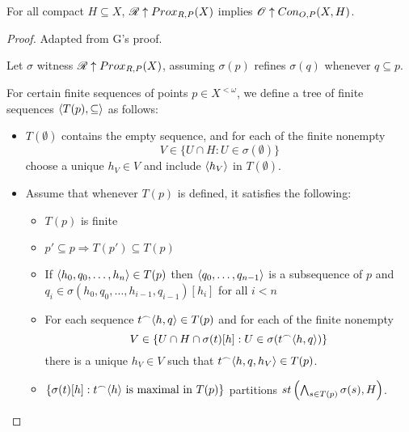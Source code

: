 \begin{theorem}
  For all compact $H\subseteq X$, $\mathscr{R} \uparrow Prox_{R,P}(X)$ implies $\mathscr{O} \uparrow Con_{O,P}(X,H)$.
\end{theorem}

\begin{proof}
  Adapted from G's proof.

  Let $\sigma$ witness $\mathscr{R} \uparrow Prox_{R,P}(X)$, assuming $\sigma(p)$ refines $\sigma(q)$ whenever $q\subseteq p$.

  For certain finite sequences of points $p\in X^{<\omega}$, we define a tree of finite sequences $\langle T(p),\subseteq\rangle$ as follows:

  \begin{itemize}
    \item $T(\emptyset)$ contains the empty sequence, and for each of the finite nonempty
      \[
        V\in\{U\cap H: U\in\sigma(\emptyset)\}
      \]
      choose a unique $h_V\in V$ and include $\langle h_V\rangle$ in $T(\emptyset)$.
    \item Assume that whenever $T(p)$ is defined, it satisfies the following:
      \begin{itemize}
        \item $T(p)$ is finite
        \item $p'\subseteq p \Rightarrow T(p')\subseteq T(p)$
        \item If $\langle h_0,q_0,\dots,h_n\rangle\in T(p)$ then $\langle q_0,\dots,q_{n-1}\rangle$ is a subsequence of $p$ and $q_i\in\sigma(h_0,q_0,\dots,h_{i-1},q_{i-1})[h_i]$ for all $i<n$
        \item For each sequence $t^\frown\langle h,q\rangle\in T(p)$ and for each of the finite nonempty
          \[
            V\in\{U\cap H\cap \sigma(t)[h]: U\in \sigma(t^\frown\langle h,q\rangle)\}
          \]
          there is a unique $h_V\in V$ such that $t^\frown\langle h,q,h_V\rangle\in T(p)$.
        \item $\{\sigma(t)[h]:t^\frown\langle h\rangle\text{ is maximal in }T(p)\}$ partitions $st\left(\bigwedge_{s\in T(p)}\sigma(s),H\right)$.
      \end{itemize}


\end{itemize}
\end{proof}
